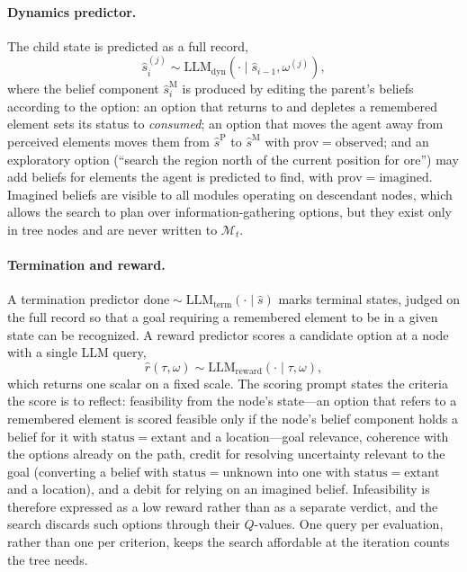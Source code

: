 \documentclass[11pt]{article}
\newcommand{\llm}[1]{\mathrm{LLM}_{\mathrm{#1}}}
\newcommand{\calM}{\mathcal{M}}
\newcommand{\shat}{\hat{s}}
\newcommand{\prov}{\mathrm{prov}}
\newcommand{\stat}{\mathrm{status}}
\begin{document}
\paragraph{Dynamics predictor.}
The child state is predicted as a full record,
\begin{equation}
\shat^{(j)}_i\sim\llm{dyn}(\cdot\mid\shat_{i-1},\omega^{(j)}),
\label{eq:dyn}
\end{equation}
where the belief component $\hat s^{\mathrm{M}}_i$ is produced by editing the parent's beliefs according to the option: an option that returns to and depletes a remembered element sets its status to \emph{consumed}; an option that moves the agent away from perceived elements moves them from $\hat s^{\mathrm{P}}$ to $\hat s^{\mathrm{M}}$ with $\prov=\mathrm{observed}$; and an exploratory option (``search the region north of the current position for ore'') may add beliefs for elements the agent is predicted to find, with $\prov=\mathrm{imagined}$. Imagined beliefs are visible to all modules operating on descendant nodes, which allows the search to plan over information-gathering options, but they exist only in tree nodes and are never written to $\calM_t$.

\paragraph{Termination and reward.}
A termination predictor $\mathrm{done}\sim\llm{term}(\cdot\mid\shat)$ marks terminal states, judged on the full record so that a goal requiring a remembered element to be in a given state can be recognized. 
A reward predictor scores a candidate option at a node with a single LLM query,
\begin{equation}
\hat r(\tau,\omega)\sim\llm{reward}(\cdot\mid\tau,\omega),
\label{eq:reward}
\end{equation}
which returns one scalar on a fixed scale. The scoring prompt states the criteria the score is to reflect: feasibility from the node's state---an option that refers to a remembered element is scored feasible only if the node's belief component holds a belief for it with $\stat=\mathrm{extant}$ and a location---goal relevance, coherence with the options already on the path, credit for resolving uncertainty relevant to the goal (converting a belief with $\stat=\mathrm{unknown}$ into one with $\stat=\mathrm{extant}$ and a location), and a debit for relying on an imagined belief. Infeasibility is therefore expressed as a low reward rather than as a separate verdict, and the search discards such options through their $Q$-values. One query per evaluation, rather than one per criterion, keeps the search affordable at the iteration counts the tree needs.
\end{document}
